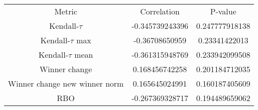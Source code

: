 \begin{tabular}{c|c|c}
Metric & Correlation & P-value \\ 
Kendall-$\tau$ & -0.345739243396 & 0.247777918138 \\ 
Kendall-$\tau$ max & -0.36708650959 & 0.23341422013 \\ 
Kendall-$\tau$ mean & -0.361315948769 & 0.233942099508 \\ 
Winner change & 0.168456742258 & 0.201184712035 \\ 
Winner change new winner norm & 0.165645024991 & 0.160187405609 \\ 
RBO & -0.267369328717 & 0.194489659062 \\ 
\end{tabular}